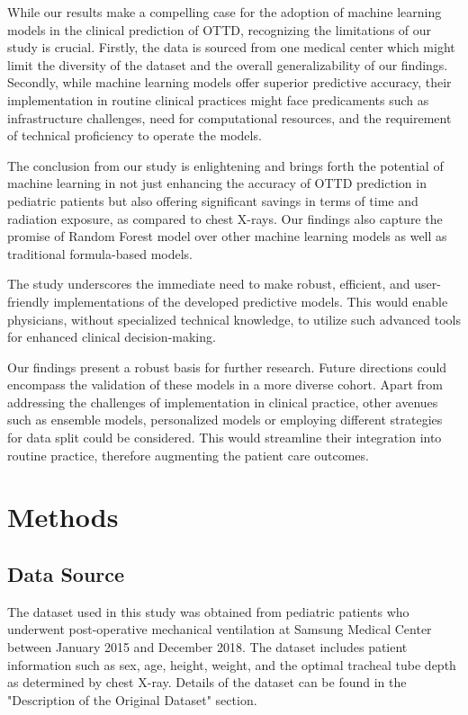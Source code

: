 \documentclass[11pt]{article}
\begin{document}
While our results make a compelling case for the adoption of machine learning models in the clinical prediction of OTTD, recognizing the limitations of our study is crucial. Firstly, the data is sourced from one medical center which might limit the diversity of the dataset and the overall generalizability of our findings. Secondly, while machine learning models offer superior predictive accuracy, their implementation in routine clinical practices might face predicaments such as infrastructure challenges, need for computational resources, and the requirement of technical proficiency to operate the models.

The conclusion from our study is enlightening and brings forth the potential of machine learning in not just enhancing the accuracy of OTTD prediction in pediatric patients but also offering significant savings in terms of time and radiation exposure, as compared to chest X-rays. Our findings also capture the promise of Random Forest model over other machine learning models as well as traditional formula-based models.

The study underscores the immediate need to make robust, efficient, and user-friendly implementations of the developed predictive models. This would enable physicians, without specialized technical knowledge, to utilize such advanced tools for enhanced clinical decision-making.

Our findings present a robust basis for further research. Future directions could encompass the validation of these models in a more diverse cohort. Apart from addressing the challenges of implementation in clinical practice, other avenues such as ensemble models, personalized models or employing different strategies for data split could be considered. This would streamline their integration into routine practice, therefore augmenting the patient care outcomes.

\section*{Methods}

\subsection*{Data Source}
The dataset used in this study was obtained from pediatric patients who underwent post-operative mechanical ventilation at Samsung Medical Center between January 2015 and December 2018. The dataset includes patient information such as sex, age, height, weight, and the optimal tracheal tube depth as determined by chest X-ray. Details of the dataset can be found in the "Description of the Original Dataset" section.
\end{document}
